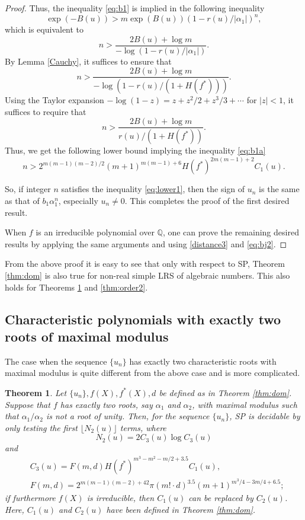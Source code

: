 \documentclass[12pt]{amsart}
\newtheorem{theorem}{Theorem}[section]
\theoremstyle{definition}
\theoremstyle{remark}
\numberwithin{equation}{section}
\begin{document}
\begin{proof}
Thus, the inequality \eqref{eq:b1} is implied in the following inequality
$$
\exp(-B(u)) > m \exp(B(u)) \left(1-r(u)/|{\alpha}_1|\right)^n,
$$
which is equivalent to
$$
n > \frac{2B(u)+ \log m}{ -\log (1-r(u)/|{\alpha}_1|)}.
$$
By Lemma \ref{Cauchy}, it suffices to ensure that
$$
n > \frac{2B(u)+ \log m}{ -\log (1-r(u)/(1+H(f^*)))}.
$$
Using the Taylor expansion $-\log (1-z)=z+z^2/2+z^3/3+ \cdots$ for $|z|<1$, it suffices to require that
\begin{equation}
\label{eq:final1}
n > \frac{2B(u)+ \log m}{ r(u)/(1+H(f^*))}.
\end{equation} 
Thus, we get the following lower bound implying the inequality \eqref{eq:b1a}
\begin{equation}
\label{eq:lower1}
n> 2^{m(m-1)(m-2)/2} (m+1)^{m(m-1)+6}H(f^*)^{2m(m-1)+2} C_1(u).
\end{equation}

 So, if integer $n$ satisfies the
inequality \eqref{eq:lower1}, then the sign of $u_n$ is the same as that of $b_1{\alpha}_1^n$, especially $u_n\ne 0$. This completes the proof of the first desired result.

When $f$ is an irreducible polynomial over ${{\mathbb Q}}$, one can prove the remaining desired results by applying the same arguments and using  \eqref{distance3} and \eqref{eq:bj2}.
\end{proof}

From the above proof it is easy to see that only with respect to SP, Theorem \ref{thm:dom} is also true for non-real simple LRS of algebraic numbers. This also holds for Theorems \ref{thm:nondom} and \ref{thm:order2}.

\subsection{Characteristic polynomials with exactly two roots of maximal modulus}
\label{sec:two}

The case when the sequence $\{u_n\}$ has exactly two characteristic roots with maximal modulus is quite different from the above case and is more complicated.

\begin{theorem}
\label{thm:nondom}
Let $\{u_n\},f(X),f^*(X),d$ be defined as in Theorem \ref{thm:dom}. Suppose that $f$ has exactly two roots, say ${\alpha}_1$ and ${\alpha}_2$, with maximal modulus such that ${\alpha}_1/{\alpha}_2$ is not a root of unity.
 Then, for the sequence $\{u_n\}$, SP is decidable by only testing the first $\lfloor N_2(u) \rfloor$ terms, where
$$
N_2(u)=2C_3(u) \log C_3(u)
$$
and
\begin{align*}
& C_3(u) =F(m,d) H(f^*)^{m^3-m^2-m/2+3.5} C_1(u), \\
& F(m,d) =2^{m(m-1)(m-2)+42}\pi (m!\cdot d)^{3.5} (m+1)^{m^3/4-3m/4+6.5};
\end{align*}
if furthermore $f(X)$ is irreducible, then $C_1(u)$ can be replaced by
$C_2(u)$. Here, $C_1(u)$ and $C_2(u)$ have been defined in Theorem \ref{thm:dom}. 
\end{theorem}
\end{document}

